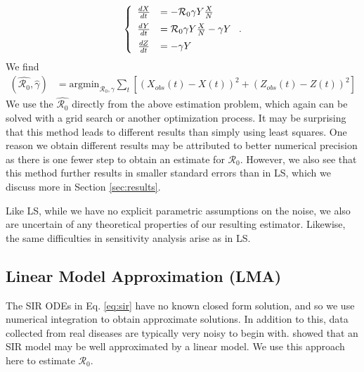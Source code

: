\message{ !name(draft_v13.tex)}\documentclass[12pt]{article}
\newcommand{\rr}{\ensuremath{\mathcal{R}_0}}
\begin{document}
\begin{align*}
  \left \{
  \begin{array}{cl}
    \frac{dX}{dt} &= - \rr \gamma Y \frac{X}{N}\vspace{.5em}\\
    \frac{dY}{dt} &=  \rr \gamma Y \frac{X}{N}  - \gamma Y\vspace{.5em} \\
    \frac{dZ}{dt} &=  - \gamma Y 
  \end{array}
  \right . .
  \end{align*}
We find
\begin{align*}
(\hat{\rr}, \hat{\gamma} ) &= \text{argmin}_{\rr, \gamma} \sum_{t} \left [ \left (X_{obs}(t) - X(t)\right )^2 + \left ( Z_{obs}(t) - Z(t) \right )^2 \right ]
\end{align*}
We use the $\hat{\rr}$ directly from the above estimation problem, which again can be solved with a grid search or another optimization process.  It may be surprising that this method leads to different results than simply using least squares.  One reason we obtain different results may be attributed to better numerical precision as there is one fewer step to obtain an estimate for $\rr$.  However, we also see that this method further results in smaller standard errors than in LS, which we discuss more in Section \ref{sec:results}.

Like LS, while we have no explicit parametric assumptions on the noise, we also are uncertain of any theoretical properties of our resulting estimator.  Likewise, the same difficulties in sensitivity analysis arise as in LS.



\subsection{Linear Model Approximation (LMA)}\label{linear-model-approximation-degree-10}

The SIR ODEs in Eq. \ref{eq:sir} have no known closed form solution, and so we use numerical integration to obtain approximate solutions.  In addition to this, data collected from real diseases are typically very noisy to begin with.  \cite{chang2017} showed that an SIR model may be well approximated by a linear model.  We use this approach here to estimate $\rr$.
\end{document}
